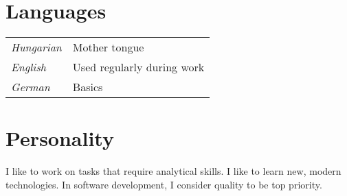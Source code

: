 \documentclass[a4paper,10pt]{article}
\newcommand{\pont}[1]{\emph{#1}}
\begin{document}
\section*{Languages}
\begin{tabular}{ll}
 \pont{Hungarian}&Mother tongue\\
 \pont{English}&Used regularly during work\\
 \pont{German}&Basics
\end{tabular}

\section*{Personality}
I like to work on tasks that require analytical skills. I like to learn new, modern technologies. In software development, I consider quality to be top priority.
\end{document}
